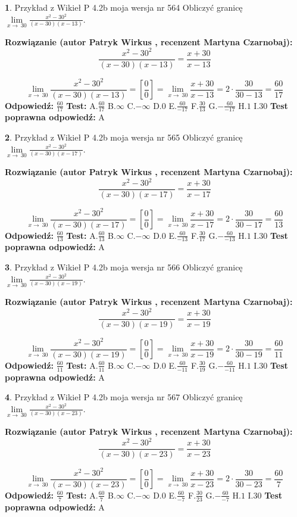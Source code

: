 \documentclass[12pt, a4paper]{article}
\theoremstyle{definition} %
\newtheorem{zad}{}
\newcommand{\zadStart}[1]{\begin{zad}#1\newline}
\newcommand{\zadStop}{\end{zad}}
\newcommand{\rozwStart}[2]{\noindent \textbf{Rozwiązanie (autor #1 , recenzent #2): }\newline}
\newcommand{\rozwStop}{\newline}
\newcommand{\odpStart}{\noindent \textbf{Odpowiedź:}\newline}
\newcommand{\odpStop}{\newline}
\newcommand{\testStart}{\noindent \textbf{Test:}\newline}
\newcommand{\testStop}{\newline}
\newcommand{\kluczStart}{\noindent \textbf{Test poprawna odpowiedź:}\newline}
\newcommand{\kluczStop}{\newline}
\begin{document}
\zadStart{Przykład z Wikieł P 4.2b moja wersja nr 564}
Obliczyć granicę $\lim\limits_{x\to\ 30}\frac{x^{2}-30^{2}}{(x-30)(x-13)}$.
\zadStop
\rozwStart{Patryk Wirkus}{Martyna Czarnobaj}
$$\frac{x^{2}-30^{2}}{(x-30)(x-13)}=\frac{x+30}{x-13}$$

$$\lim\limits_{x\to\ 30}\frac{x^{2}-30^{2}}{(x-30)(x-13)}=[\frac{0}{0}]=\lim\limits_{x\to\ 30}\frac{x+30}{x-13}=2 \cdot \frac{30}{30-13} = \frac{60}{17}$$
\rozwStop
\odpStart
$\frac{60}{17}$
\odpStop
\testStart
A.$\frac{60}{17}$
B.$\infty$
C.$-\infty$
D.$0$
E.$\frac{60}{-17}$
F.$\frac{30}{13}$
G.$-\frac{60}{-17}$
H.$1$
I.$30$
\testStop
\kluczStart
A
\kluczStop



\zadStart{Przykład z Wikieł P 4.2b moja wersja nr 565}
Obliczyć granicę $\lim\limits_{x\to\ 30}\frac{x^{2}-30^{2}}{(x-30)(x-17)}$.
\zadStop
\rozwStart{Patryk Wirkus}{Martyna Czarnobaj}
$$\frac{x^{2}-30^{2}}{(x-30)(x-17)}=\frac{x+30}{x-17}$$

$$\lim\limits_{x\to\ 30}\frac{x^{2}-30^{2}}{(x-30)(x-17)}=[\frac{0}{0}]=\lim\limits_{x\to\ 30}\frac{x+30}{x-17}=2 \cdot \frac{30}{30-17} = \frac{60}{13}$$
\rozwStop
\odpStart
$\frac{60}{13}$
\odpStop
\testStart
A.$\frac{60}{13}$
B.$\infty$
C.$-\infty$
D.$0$
E.$\frac{60}{-13}$
F.$\frac{30}{17}$
G.$-\frac{60}{-13}$
H.$1$
I.$30$
\testStop
\kluczStart
A
\kluczStop



\zadStart{Przykład z Wikieł P 4.2b moja wersja nr 566}
Obliczyć granicę $\lim\limits_{x\to\ 30}\frac{x^{2}-30^{2}}{(x-30)(x-19)}$.
\zadStop
\rozwStart{Patryk Wirkus}{Martyna Czarnobaj}
$$\frac{x^{2}-30^{2}}{(x-30)(x-19)}=\frac{x+30}{x-19}$$

$$\lim\limits_{x\to\ 30}\frac{x^{2}-30^{2}}{(x-30)(x-19)}=[\frac{0}{0}]=\lim\limits_{x\to\ 30}\frac{x+30}{x-19}=2 \cdot \frac{30}{30-19} = \frac{60}{11}$$
\rozwStop
\odpStart
$\frac{60}{11}$
\odpStop
\testStart
A.$\frac{60}{11}$
B.$\infty$
C.$-\infty$
D.$0$
E.$\frac{60}{-11}$
F.$\frac{30}{19}$
G.$-\frac{60}{-11}$
H.$1$
I.$30$
\testStop
\kluczStart
A
\kluczStop



\zadStart{Przykład z Wikieł P 4.2b moja wersja nr 567}
Obliczyć granicę $\lim\limits_{x\to\ 30}\frac{x^{2}-30^{2}}{(x-30)(x-23)}$.
\zadStop
\rozwStart{Patryk Wirkus}{Martyna Czarnobaj}
$$\frac{x^{2}-30^{2}}{(x-30)(x-23)}=\frac{x+30}{x-23}$$

$$\lim\limits_{x\to\ 30}\frac{x^{2}-30^{2}}{(x-30)(x-23)}=[\frac{0}{0}]=\lim\limits_{x\to\ 30}\frac{x+30}{x-23}=2 \cdot \frac{30}{30-23} = \frac{60}{7}$$
\rozwStop
\odpStart
$\frac{60}{7}$
\odpStop
\testStart
A.$\frac{60}{7}$
B.$\infty$
C.$-\infty$
D.$0$
E.$\frac{60}{-7}$
F.$\frac{30}{23}$
G.$-\frac{60}{-7}$
H.$1$
I.$30$
\testStop
\kluczStart
A
\kluczStop
\end{document}
